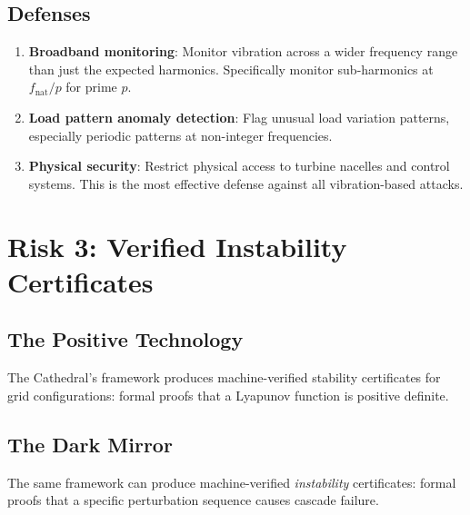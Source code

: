 \documentclass[11pt,a4paper]{article}
\begin{document}
\subsection{Defenses}

\begin{enumerate}
  \item \textbf{Broadband monitoring}: Monitor vibration across a
    wider frequency range than just the expected harmonics.
    Specifically monitor sub-harmonics at $f_{\text{nat}}/p$ for
    prime $p$.
  \item \textbf{Load pattern anomaly detection}: Flag unusual load
    variation patterns, especially periodic patterns at non-integer
    frequencies.
  \item \textbf{Physical security}: Restrict physical access to
    turbine nacelles and control systems. This is the most effective
    defense against all vibration-based attacks.
\end{enumerate}

\section{Risk 3: Verified Instability Certificates}
\label{sec:instability}

\subsection{The Positive Technology}

The Cathedral's framework produces machine-verified stability
certificates for grid configurations: formal proofs that a
Lyapunov function is positive definite.

\subsection{The Dark Mirror}

The same framework can produce machine-verified \emph{instability}
certificates: formal proofs that a specific perturbation sequence
causes cascade failure.
\end{document}
